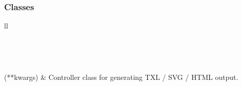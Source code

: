 \documentclass[letterpaper,10pt,english]{sphinxmanual}
\begin{document}
\subsubsection{Classes}
\label{Chapters/PythonModuleReference/TXLWriter/TXLWizard.TXLWriter:classes}
\begin{longtable}{ll}
\hline
\endfirsthead

%
{{}} \\
\hline
\endhead

\hline {} \\ \hline
\endfoot

\endlastfoot


{\hyperref[Chapters/PythonModuleReference/TXLWriter/TXLWizard.TXLWriter:TXLWizard.TXLWriter.TXLWriter]{}}(**kwargs)
 & 
Controller class for generating TXL / SVG / HTML output.
\\
\hline\end{longtable}

\end{document}
